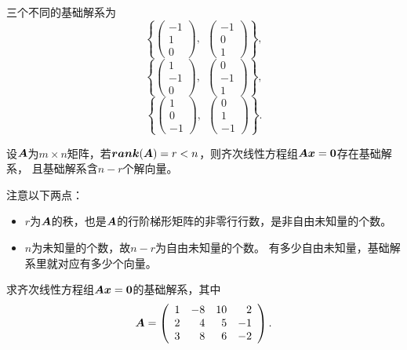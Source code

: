 \begin{frame}
\begin{jie}[续]
三个不同的基础解系为
$$
\left\{
  \left(
    \begin{array}{r}
      -1\\1\\0
    \end{array}
  \right),~~
  \left(
    \begin{array}{r}
      -1\\0\\1
    \end{array}
  \right)
\right\},
$$
$$
\left\{
  \left(
    \begin{array}{r}
      1\\-1\\0
    \end{array}
  \right),~~
  \left(
    \begin{array}{r}
      0\\-1\\1
    \end{array}
  \right)
\right\},
$$
$$
\left\{
  \left(
    \begin{array}{r}
      1\\0\\-1
    \end{array}
  \right),~~
  \left(
    \begin{array}{r}
      0\\1\\-1
    \end{array}
  \right)
\right\}.
$$
\end{jie}
\end{frame}


\begin{frame}
\begin{dingli}
  设$\boldsymbol{A}$为$m\times n$矩阵，若$\boldsymbol{rank}(\boldsymbol{A})=r<n$，则齐次线性方程组$\MA\vx=\M0$存在基础解系，
  且基础解系含$n-r$个解向量。
\end{dingli}

\begin{zhu}
  注意以下两点：
  \begin{itemize}
  \item $r$为$\boldsymbol{A}$的秩，也是$\boldsymbol{A}$的行阶梯形矩阵的非零行行数，是非自由未知量的个数。 
  \item $n$为未知量的个数，故$n-r$为自由未知量的个数。 有多少自由未知量，基础解系里就对应有多少个向量。
  \end{itemize}
\end{zhu}
\end{frame}

\begin{frame}[allowframebreaks]
\begin{li}
  求齐次线性方程组$\MA\vx=\M0$的基础解系，其中
  $$
  \boldsymbol{A} = \left(
    \begin{array}{rrrr}
      1&-8&10&2\\
      2&4&5&-1\\
      3&8&6&-2
    \end{array}
  \right).
  $$
\end{li} 
\end{frame}


